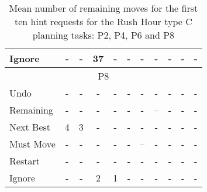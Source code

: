 \begin{table}[tpb]
{\begin{tabular}{|l|cccccccccc|}
Ignore & - & - & 37 & - & - & - & - & - & - & - \\ \hline
\multicolumn{11}{|c|}{P8} \\ \hline
Undo & - & - & - & - & - & - & - & - & - & - \\ \cline{1-1}
Remaining & - & - & - & - & - & - & -- & - & - & - \\ \cline{1-1}
Next Best & 4 & 3 & - & - & - & - & - & - & - & - \\ \cline{1-1}
Must Move & - & - & - & - & - & -- & - & - & - & - \\ \cline{1-1}
Restart & - & - & - & - & - & - & - & - & - & - \\ \cline{1-1}
Ignore & - & - & 2 & 1 & - & - & - & - & - & - \\ \hline
\end{tabular}%
}
\caption{Mean number of remaining moves for the first ten hint requests for the Rush Hour type C planning tasks: P2, P4, P6 and P8}
\label{tab:requesttypec}
\end{table}

